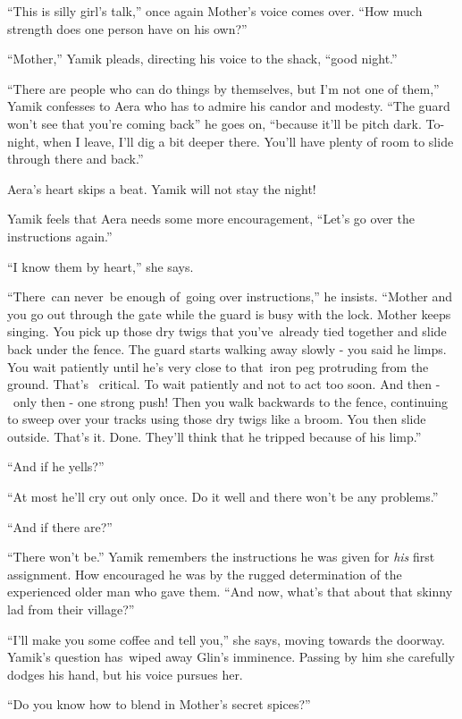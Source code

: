 \documentclass[twoside,11pt]{book}
\begin{document}
{}``This is silly girl's talk,'' once again Mother's voice comes over. ``How much strength
does one person have on his own?''

{}``Mother,'' Yamik pleads, directing his voice to the shack, ``good night.''

{}``There are people who can do things by themselves, but I'm not one of them,''
Yamik{ }confesses to Aera who has to admire his candor and modesty. ``The guard
won't see that you're coming back'' he goes on, ``because it'll be pitch dark. To-night, when I leave, I'll dig a bit
deeper there. You'll have plenty of room to slide through there and back.''

Aera's heart skips a beat. Yamik will not stay the night!

Yamik feels that Aera needs some more encouragement, ``Let's go over the instructions again.''

{}``I know them by heart,'' she says.

{}``There~can never~be enough of~going over instructions,'' he insists. ``Mother and you go
out through the gate while the guard is busy with the lock. Mother keeps singing. You pick up those dry twigs that
you've~already tied together and slide back under the fence. The guard starts walking away slowly
{{}- }you said he limps. You wait patiently until he's very close to that~iron
peg protruding from the ground. That's \ critical. To wait patiently and not to act too soon. And then - \ only then -
one strong push! Then you walk backwards to the fence, continuing to sweep over your tracks using those dry
twigs{ }like a broom. You then slide outside. That's it. Done. They'll think
that he tripped{ }because of his limp.''

{}``And if he yells?''

{}``At most he'll cry out only once. Do it well and there won't be any problems.''

{}``And if there are?''

``There won't be.'' Yamik remembers the instructions he was given for \textit{his} first assignment. How
encouraged he was by the rugged determination of the experienced older man who gave them. ``And now, what's that about
that skinny lad from their village?''

{}``I'll make you some coffee and tell you,'' she says, moving towards the doorway. Yamik's question has~wiped away
Glin's {imminence}. Passing by him she carefully dodges his hand, but his voice pursues her.

{}``Do you know how to blend in Mother's secret spices?''
\end{document}
